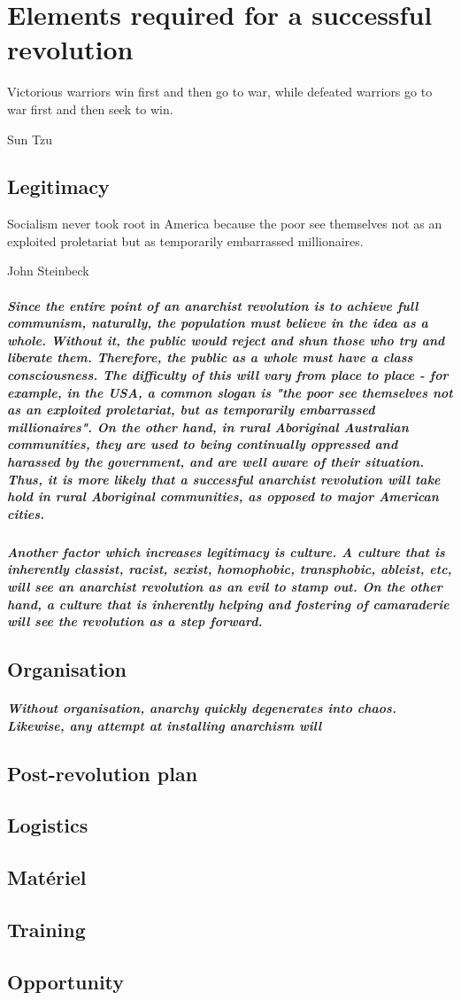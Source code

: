 \chapter{Elements required for a successful revolution}
  \epigraph{Victorious warriors win first and then go to war, while defeated warriors go to war first and then seek to win.}{Sun Tzu}
	\section{Legitimacy}
    \epigraph{Socialism never took root in America because the poor see themselves not as an exploited proletariat but as temporarily embarrassed millionaires.}{John Steinbeck}
      \paragraph{Since the entire point of an anarchist revolution is to achieve full communism, naturally, the population must believe in the idea as a whole. Without it, the public would reject and shun those who try and liberate them. Therefore, the public as a whole must have a class consciousness. The difficulty of this will vary from place to place - for example, in the USA, a common slogan is "the poor see themselves not as an exploited proletariat, but as temporarily embarrassed millionaires". On the other hand, in rural Aboriginal Australian communities, they are used to being continually oppressed and harassed by the government, and are well aware of their situation. Thus, it is more likely that a successful anarchist revolution will take hold in rural Aboriginal communities, as opposed to major American cities.}
      \paragraph{Another factor which increases legitimacy is culture. A culture that is inherently classist, racist, sexist, homophobic, transphobic, ableist, etc, will see an anarchist revolution as an evil to stamp out. On the other hand, a culture that is inherently helping and fostering of camaraderie will see the revolution as a step forward.}
       
    \section{Organisation}
      \paragraph{Without organisation, anarchy quickly degenerates into chaos. Likewise, any attempt at installing anarchism will }
    \section{Post-revolution plan}
    \section{Logistics}
    \section{Matériel}
    \section{Training}
    \section{Opportunity}